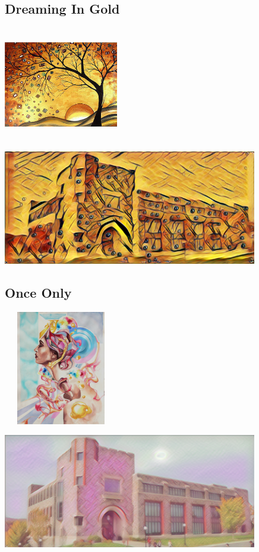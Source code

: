 \documentclass[12pt]{article}
\begin{document}
\subsection{Dreaming In Gold}
\begin{minipage}[c]{0.3\textwidth}
\includegraphics[height=50mm, width=50mm]{visuals/styles/dreaming-in-gold.jpg}
\end{minipage}
\begin{minipage}[c]{0.6\textwidth}
\includegraphics[height=50mm]{visuals/results/04.png}
\end{minipage}

\subsection{Once Only}
\begin{minipage}[c]{0.3\textwidth}
\includegraphics[height=50mm, width=50mm]{visuals/styles/once-only.jpg}
\end{minipage}
\begin{minipage}[c]{0.6\textwidth}
\includegraphics[height=50mm]{visuals/results/05.png}
\end{minipage}
\end{document}
